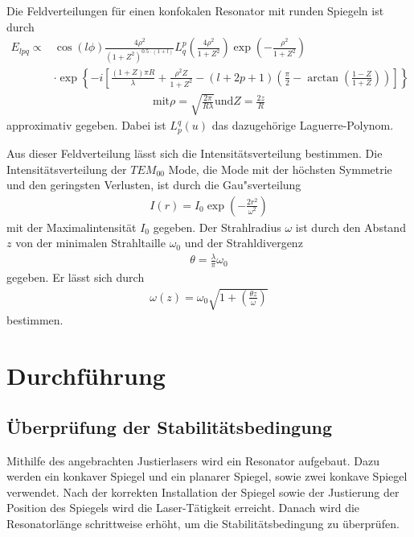 \documentclass[]{scrartcl}
\begin{document}
Die Feldverteilungen für einen konfokalen Resonator mit runden Spiegeln ist durch
\begin{align*}
 E_{lpq} \propto &\cos \left(l \phi \right) \frac{4\rho^ 2}{\left(1+Z^2 \right)^{0.5\cdot \left(1+l\right)}}L_{q}^{p}\left( \frac{4\rho^2}{1+Z^2} \right)\exp \left(-\frac{\rho^2}{1+Z^2}\right) \\
&\cdot\exp \left\{-i \left[ \frac{\left(1+Z \right)\pi R}{\lambda} + \frac{\rho^2Z}{1+Z^2} - \left(l+2p+1\right)\left(\frac{\pi}{2}-\arctan \left(\frac{1-Z}{1+Z}\right) \right) \right] \right\}
\end{align*}
\begin{align*}
\text{mit} \rho= \sqrt{\frac{2\pi}{R\lambda}} \text{und} Z=\frac{2z}{R}
\end{align*}
approximativ gegeben. Dabei ist $L^{q}_{p}\left(u\right) $ das dazugehörige Laguerre-Polynom.

Aus dieser Feldverteilung lässt sich die Intensitätsverteilung bestimmen. Die Intensitätsverteilung der $TEM_{00}$ Mode, die Mode mit der höchsten Symmetrie und den geringsten Verlusten, ist durch die Gau"sverteilung
\begin{align}
 I\left(r\right)=I_0\exp \left(-\frac{2r^2}{\omega^2}\right)
 \label{eq:tem00}
\end{align}
mit der Maximalintensität $I_0$ gegeben. Der Strahlradius $\omega$ ist durch den Abstand $z$ von der minimalen Strahltaille $\omega_0$ und der Strahldivergenz 
\begin{align}
 \theta = \frac{\lambda}{\pi}\omega_0
\end{align}
gegeben. Er lässt sich durch
\begin{align}
 \omega\left(z\right)=\omega_0\sqrt{1+\left(\frac{\theta z}{\omega}\right)}
\end{align}
bestimmen. 
\section{Durchführung}

\subsection{Überprüfung der Stabilitätsbedingung}
Mithilfe des angebrachten Justierlasers wird ein Resonator aufgebaut. Dazu werden ein konkaver Spiegel und ein planarer Spiegel, sowie zwei konkave Spiegel verwendet. Nach der korrekten Installation der Spiegel sowie der Justierung der Position des Spiegels wird die Laser-Tätigkeit erreicht. Danach wird die Resonatorlänge schrittweise erhöht, um die Stabilitätsbedingung zu überprüfen.
\end{document}
